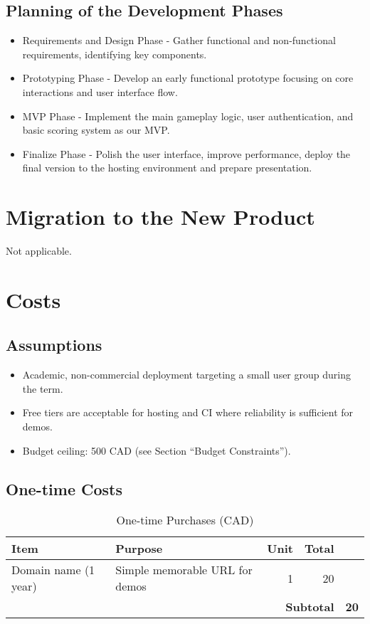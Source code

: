 \documentclass[12pt]{article}
\begin{document}
\subsection{Planning of the Development Phases}
\begin{itemize}
	\item Requirements and Design Phase - Gather functional and non-functional requirements, identifying key components.
	\item Prototyping Phase - Develop an early functional prototype focusing on core interactions and user interface flow.
	\item MVP Phase - Implement the main gameplay logic, user authentication, and basic scoring system as our MVP.
	\item Finalize Phase - Polish the user interface, improve performance, deploy the final version to the hosting environment and prepare presentation.
	
\end{itemize}

\section{Migration to the New Product}
Not applicable.

\section{Costs}

\subsection{Assumptions}
\begin{itemize}
  \item Academic, non-commercial deployment targeting a small user group during the term.
  \item Free tiers are acceptable for hosting and CI where reliability is sufficient for demos.
  \item Budget ceiling: 500 CAD (see Section ``Budget Constraints'').
\end{itemize}

\subsection{One-time Costs}
\begin{table}[hp]
  \caption{One-time Purchases (CAD)}\label{tab:one_time_costs}
  \begin{tabularx}{\textwidth}{lXrrr}
    \toprule
    \textbf{Item} & \textbf{Purpose} & \textbf{Unit} & \textbf{Total} \\
    \midrule
    Domain name (1 year) & Simple memorable URL for demos & 1 & 20 \\
    \midrule
    \multicolumn{4}{r}{\textbf{Subtotal}} & \textbf{20} \\
    \bottomrule
  \end{tabularx}
\end{table}
\end{document}
